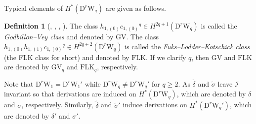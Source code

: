 \documentclass[12pt]{amsart}
\newcommand{\GV}{\mathrm{GV}}
\newcommand{\FLK}{\mathrm{FLK}}
\newcommand{\W}{\mathrm{W}}
\newcommand{\D}{\mathrm{D}}
\theoremstyle{definition}
\newtheorem{definition}[theorem]{Definition}
\theoremstyle{remark}
\begin{document}
Typical elements of $H^*(\D^r\W_q)$ are given as follows.

\begin{definition}[\cite{Godbillon-Vey}, \cite{Fuks}, \cite{Lodder}, \cite{Kotschick}]
The class $h_{1,(0)}c_{1,(0)}{}^q\in H^{2q+1}(\D^r\W_q)$ is called the \textit{Godbillon--Vey class} and denoted by $\GV$.
The class $h_{1,(0)}h_{1,(1)}c_{1,(0)}{}^q\in H^{2q+2}(\D^r\W_q)$ is called the \textit{Fuks--Lodder--Kotschick class} (the FLK class for short) and denoted by $\FLK$.
If we clarify $q$, then $\GV$ and $\FLK$ are denoted by $\GV_q$ and $\FLK_q$, respectively.
\end{definition}

Note that $\D^r\W_1=\D^r\W_1'$ while $\D^r\W_q\neq\D^r\W_q'$ for $q\geq2$.
As $\widetilde\delta$ and $\widetilde\sigma$ leave $\mathscr{I}$ invariant so that derivations are induced on $H^*(\D^r\W_q)$, which are denoted by $\delta$ and $\sigma$, respectively.
Similarly,  $\widetilde\delta$ and $\widetilde\sigma'$ induce derivations on $H^*(\D^r\W_q')$, which are denoted by $\delta'$ and $\sigma'$.
\end{document}
